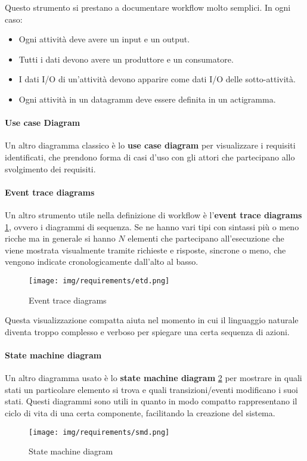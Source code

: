 Questo strumento si prestano a documentare workflow molto semplici. In ogni caso:
\begin{itemize}
    \item Ogni attività deve avere un input e un output.
    \item Tutti i dati devono avere un produttore e un consumatore.
    \item I dati I/O di un'attività devono apparire come dati I/O delle sotto-attività.
    \item Ogni attività in un datagramm deve essere definita in un actigramma.
\end{itemize}
\paragraph{Use case Diagram}
Un altro diagramma classico è lo \textbf{use case diagram} per visualizzare i requisiti identificati, che prendono forma di casi d'uso con gli attori che partecipano allo svolgimento dei requisiti.
\paragraph{Event trace diagrams}
Un altro strumento utile nella definizione di workflow è l'\textbf{event trace diagrams} \ref{fig:etd}, ovvero i diagrammi di sequenza. Se ne hanno vari tipi con sintassi più o meno ricche ma in generale si hanno $N$ elementi che partecipano all'esecuzione che viene mostrata visualmente tramite richieste e risposte, sincrone o meno, che vengono indicate cronologicamente dall'alto al basso.
\begin{figure}[!ht]
    \centering
    \texttt{[image: img/requirements/etd.png]}
    \caption{Event trace diagrams}
    \label{fig:etd}
\end{figure}
Questa visualizzazione compatta aiuta nel momento in cui il linguaggio naturale diventa troppo complesso e verboso per spiegare una certa sequenza di azioni.
\paragraph{State machine diagram}
Un altro diagramma usato è lo \textbf{state machine diagram} \ref{fig:smd} per mostrare in quali stati un particolare elemento si trova e quali transizioni/eventi modificano i suoi stati. Questi diagrammi sono utili in quanto in modo compatto rappresentano il ciclo di vita di una certa componente, facilitando la creazione del sistema.
\begin{figure}[!ht]
    \centering
    \texttt{[image: img/requirements/smd.png]}
    \caption{State machine diagram}
    \label{fig:smd}
\end{figure}
